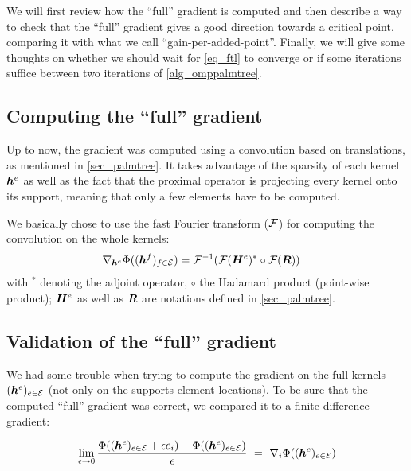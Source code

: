 We will first review how the “full” gradient is computed and then describe a way to check that the “full” gradient gives a good direction towards a critical point, comparing it with what we call “gain-per-added-point”. Finally, we will give some thoughts on whether we should wait for \eqref{eq_ftl} to converge or if some iterations suffice between two iterations of \cref{alg_omppalmtree}.


\subsection{Computing the “full” gradient} \label{sec_full_grad}
Up to now, the gradient was computed using a convolution based on translations, as mentioned in \cref{sec_palmtree}. It takes advantage of the sparsity of each kernel $\bm{h}^e$ as well as the fact that the proximal operator is projecting every kernel onto its support, meaning that only a few elements have to be computed.

We basically chose to use the fast Fourier transform (${\mathcal F}$) for computing the convolution on the whole kernels:
\begin{align*}
	\nabla_{\bm{h}^e} \Phi((\bm{h}^f)_{f \in \mathcal E})&= {\mathcal F}^{-1}({\mathcal F}(\bm{H}^{e})^* \circ {\mathcal F}(\bm{R}))
\end{align*}
with ${}^*$ denoting the adjoint operator, $\circ$ the Hadamard product (point-wise product); $\bm{H}^{e}$ as well as $\bm{R}$ are notations defined in \cref{sec_palmtree}. 

\subsection{Validation of the “full” gradient}
We had some trouble when trying to compute the gradient on the full kernels $(\bm{h}^e)_{e \in \mathcal E}$ (not only on the supports element locations). To be sure that the computed “full” gradient was correct, we compared it to a finite-difference gradient:

$$\lim_{\epsilon \rightarrow 0} \frac{\Phi((\bm{h}^e)_{e \in \mathcal E}+\epsilon e_i) - \Phi ((\bm{h}^e)_{e \in \mathcal E}) }{\epsilon} ~=~ \nabla_i \Phi ((\bm{h}^e)_{e \in \mathcal E})$$


